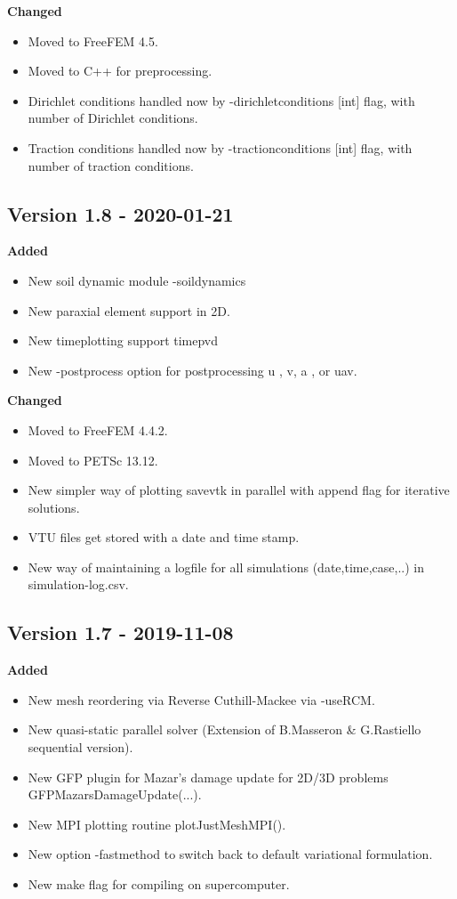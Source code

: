 \documentclass{report}
\begin{document}
\textbf{Changed}
\begin{itemize}
\item Moved to FreeFEM 4.5.
\item Moved to C++ for preprocessing.
\item Dirichlet conditions handled now by {\ttfamily -dirichletconditions [int]} flag, with {\ttfamily  [int]} number of Dirichlet conditions.
\item Traction conditions handled now by {\ttfamily -tractionconditions [int]} flag, with {\ttfamily  [int]} number of traction conditions.

\end{itemize}

\subsection{Version 1.8 - 2020-01-21}
\textbf{Added}
\begin{itemize}
 \item New soil dynamic module {\ttfamily -soildynamics}
 \item New paraxial element support in 2D.
 \item New timeplotting support {\ttfamily timepvd}
 \item New {\ttfamily -postprocess} option for postprocessing {\ttfamily u} , {\ttfamily v},  {\ttfamily a} , or {\ttfamily uav}. 
\end{itemize}

\textbf{Changed}
\begin{itemize}
 \item Moved to FreeFEM 4.4.2.
 \item Moved to PETSc 13.12.
 \item New simpler way of plotting {\ttfamily savevtk} in parallel with {\ttfamily append} flag for iterative solutions.
 \item VTU files get stored with a date and time stamp.
 \item New way of maintaining a logfile for all simulations (date,time,case,..) in {\ttfamily simulation-log.csv}.
\end{itemize}

\subsection{Version 1.7 - 2019-11-08}

\textbf{Added}
\begin{itemize}
 \item New  mesh reordering via Reverse Cuthill-Mackee via {\ttfamily -useRCM}. 
 \item New quasi-static parallel solver (Extension of B.Masseron \& G.Rastiello sequential version).
 \item New GFP plugin for Mazar's damage update for 2D/3D problems {\ttfamily GFPMazarsDamageUpdate(...)}.
 \item New MPI plotting routine {\ttfamily plotJustMeshMPI()}.
 \item New option {\ttfamily -fastmethod} to switch back to default variational formulation.
 \item New  make flag for compiling on supercomputer. 
\end{itemize}
\end{document}
